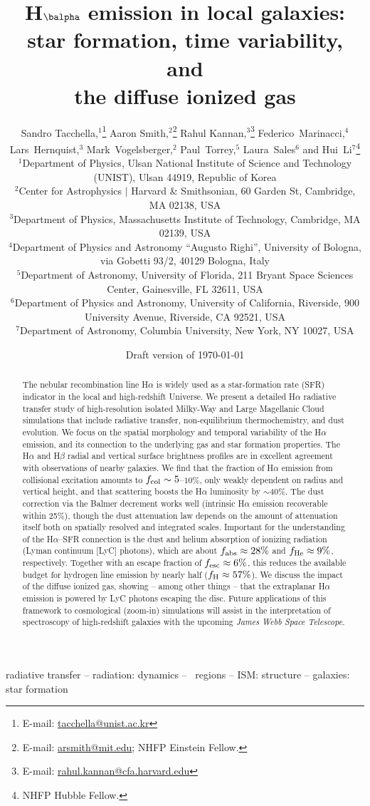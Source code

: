 \documentclass[fleqn,usenatbib]{mnras}
\title[H$\alpha$ emission in local galaxies]{H$\balpha$ emission in local galaxies: star formation, time variability, and \\the diffuse ionized gas}
\author[Tacchella et al.]{%
Sandro Tacchella\orcid{0000-0002-8224-4505},$^{1}$\thanks{E-mail: \href{mailto:tacchella@unist.ac.kr}{tacchella@unist.ac.kr}}
Aaron Smith\orcid{0000-0002-2838-9033},$^{2}$\thanks{E-mail: \href{mailto:arsmith@mit.edu}{arsmith@mit.edu}; NHFP Einstein Fellow.}
Rahul Kannan\orcid{0000-0001-6092-2187},$^3$\thanks{E-mail: \href{mailto:rahul.kannan@cfa.harvard.edu}{rahul.kannan@cfa.harvard.edu}}
Federico~Marinacci\orcid{0000-0003-3816-7028},$^{4}$
\newauthor
Lars~Hernquist,$^{3}$
Mark~Vogelsberger\orcid{0000-0001-8593-7692},$^{2}$
Paul~Torrey\orcid{0000-0002-5653-0786},$^{5}$
Laura~Sales\orcid{0000-0002-3790-720X}$^{6}$
and
Hui~Li\orcid{0000-0002-1253-2763}$^{7}$\thanks{NHFP Hubble Fellow.}
\\
$^{1}$Department of Physics, Ulsan National Institute of Science and Technology (UNIST), Ulsan 44919, Republic of Korea \\
$^{2}$Center for Astrophysics $\vert$ Harvard \& Smithsonian, 60 Garden St, Cambridge, MA 02138, USA \\
$^{3}$Department of Physics, Massachusetts Institute of Technology, Cambridge, MA 02139, USA \\
$^{4}$Department of Physics and Astronomy ``Augusto Righi'', University of Bologna, via Gobetti 93/2, 40129 Bologna, Italy \\
$^{5}$Department of Astronomy, University of Florida, 211 Bryant Space Sciences Center, Gainesville, FL 32611, USA \\
$^{6}$Department of Physics and Astronomy, University of California, Riverside, 900 University Avenue, Riverside, CA 92521, USA \\
$^{7}$Department of Astronomy, Columbia University, New York, NY 10027, USA
}
\date{Draft version of \today}
\newcommand\HII{\ion{H}{II}~} %
\begin{document}
\label{firstpage}
\pagerange{\pageref{firstpage}--\pageref{lastpage}}
\maketitle

\begin{abstract}
The nebular recombination line H$\alpha$ is widely used as a star-formation rate (SFR) indicator in the local and high-redshift Universe. We present a detailed H$\alpha$ radiative transfer study of high-resolution isolated Milky-Way and Large Magellanic Cloud simulations that include radiative transfer, non-equilibrium thermochemistry, and dust evolution. We focus on the spatial morphology and temporal variability of the H$\alpha$ emission, and its connection to the underlying gas and star formation properties. The H$\alpha$ and H$\beta$ radial and vertical surface brightness profiles are in excellent agreement with observations of nearby galaxies. We find that the fraction of H$\alpha$ emission from collisional excitation amounts to $f_{\rm col}\sim5$--$10\%$, only weakly dependent on radius and vertical height, and that scattering boosts the H$\alpha$ luminosity by $\sim40\%$. The dust correction via the Balmer decrement works well (intrinsic H$\alpha$ emission recoverable within 25\%), though the dust attenuation law depends on the amount of attenuation itself both on spatially resolved and integrated scales. Important for the understanding of the H$\alpha$--SFR connection is the dust and helium absorption of ionizing radiation (Lyman continuum [LyC] photons), which are about $f_{\rm  abs}\approx28\%$ and $f_{\rm He}\approx9\%$, respectively. Together with an escape fraction of $f_{\rm esc}\approx6\%$, this reduces the available budget for hydrogen line emission by nearly half ($f_{\rm H}\approx57\%$). We discuss the impact of the diffuse ionized gas, showing -- among other things -- that the extraplanar H$\alpha$ emission is powered by LyC photons escaping the disc. Future applications of this framework to cosmological (zoom-in) simulations will assist in the interpretation of spectroscopy of high-redshift galaxies with the upcoming \textit{James Webb Space Telescope}.
\end{abstract}

\begin{keywords}
radiative transfer -- radiation: dynamics -- \HII regions -- ISM: structure -- galaxies: star formation
\end{keywords}
\end{document}
